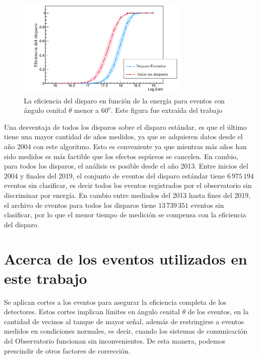 \begin{figure}[H]
  \centering
  \includegraphics[width=0.75\textwidth]{comparacion_triggers.png}
  \caption{La eficiencia del disparo en función de la energía para eventos con ángulo cenital $\theta$ menor a $60^o$. Este figura fue extraída del trabajo \cite{triggers_ref}}
  \label{fig:triggers}
\end{figure}


Una desventaja de todos los disparos sobre el disparo estándar, es que el último tiene una mayor cantidad de años medidos, ya que se adquieren datos  desde el año 2004 con este algoritmo. Esto es conveniente ya que mientras más años han sido medidos es más factible que los efectos espúreos se cancelen. En cambio, para todos los disparos, el análisis  es posible desde el año 2013. Entre inicios del 2004 y finales del 2019, el conjunto de eventos del disparo estándar tiene $6\,975\,194$ eventos sin clasificar, es decir todos los eventos registrados por el observatorio sin discriminar por energía. En cambio entre mediados del 2013 hasta fines del 2019, el archivo de eventos para todos los disparos tiene $13\,739\,351$ eventos sin clasificar, por lo que el menor tiempo de medición se compensa con la eficiencia del disparo.


\section{Acerca de los eventos utilizados en este trabajo} \label{filtro}

Se aplican cortes a los eventos para asegurar la eficiencia completa de los detectores. Estos cortes implican límites en ángulo cenital $\theta$ de los eventos, en la cantidad de vecinos al tanque de mayor señal, además de restringirse a eventos medidos en condiciones normales, es decir, cuando los sistemas de comunicación del Observatorio funcionan sin inconvenientes. De esta manera, podemos prescindir de otros factores de corrección.

